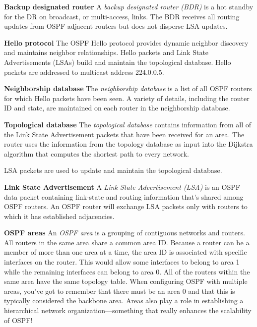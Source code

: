 \protect\hypertarget{c18.xhtmlux5cux23Page_750}{}{}\textbf{Backup
designated router} A \emph{backup designated router (BDR)} is a hot
standby for the DR on broadcast, or multi-access, links. The BDR
receives all routing updates from OSPF adjacent routers but does not
disperse LSA updates.

\textbf{Hello protocol} The OSPF Hello protocol provides dynamic
neighbor discovery and maintains neighbor relationships. Hello packets
and Link State Advertisements (LSAs) build and maintain the topological
database. Hello packets are addressed to multicast address 224.0.0.5.

\textbf{Neighborship database} The \emph{neighborship database} is a
list of all OSPF routers for which Hello packets have been seen. A
variety of details, including the router ID and state, are maintained on
each router in the neighborship database.

\textbf{Topological database} The \emph{topological database} contains
information from all of the Link State Advertisement packets that have
been received for an area. The router uses the information from the
topology database as input into the Dijkstra algorithm that computes the
shortest path to every network.

\begin{note}
LSA packets are used to update and maintain the topological database.
\end{note}

\textbf{Link State Advertisement} A \emph{Link State Advertisement
(LSA)} is an OSPF data packet containing link-state and routing
information that's shared among OSPF routers. An OSPF router will
exchange LSA packets only with routers to which it has established
adjacencies.

\textbf{OSPF areas} An \emph{OSPF area} is a grouping of contiguous
networks and routers. All routers in the same area share a common area
ID. Because a router can be a member of more than one area at a time,
the area ID is associated with specific interfaces on the router. This
would allow some interfaces to belong to area 1 while the remaining
interfaces can belong to area 0. All of the routers within the same area
have the same topology table. When configuring OSPF with multiple areas,
you've got to remember that there must be an area 0 and that this is
typically considered the backbone area. Areas also play a role in
establishing a hierarchical network organization---something that really
enhances the scalability of OSPF!

